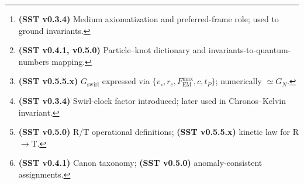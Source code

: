 \documentclass[reprint,aps,onecolumn,nofootinbib]{revtex4-2}
\newcommand{\swirlarrow}{%
    \mathchoice{\mkern-2mu\scriptstyle\boldsymbol{\circlearrowleft}}%
    {\mkern-2mu\scriptstyle\boldsymbol{\circlearrowleft}}%
    {\mkern-2mu\scriptscriptstyle\boldsymbol{\circlearrowleft}}%
    {\mkern-2mu\scriptscriptstyle\boldsymbol{\circlearrowleft}}%
}
\newcommand{\vswirl}{\mathbf{v}_{\swirlarrow}}
\newcommand{\FmaxEM}{F_{\mathrm{EM}}^{\max}}             %
\begin{document}
\begin{abstract}
\paragraph{Core Axioms (SST)}
    \begin{enumerate}
    \item \textbf{Swirl Medium:} Physics is formulated on $\mathbb{R}^3$ with absolute reference time. Dynamics occur in a frictionless, incompressible \emph{swirl condensate}, which serves as a universal substrate.\footnote{\textbf{(SST v0.3.4)} Medium axiomatization and preferred-frame role; used to ground invariants.}
    \item \textbf{Swirl Strings (Circulation and Topology):} Particles and field quanta correspond to closed vortex filaments (\emph{swirl strings}). The circulation of the swirl velocity around any closed loop is quantized:
    \[
        \Gamma = \oint \vswirl \cdot d\boldsymbol{\ell} = n\,\kappa,\qquad n\in\mathbb{Z},\qquad \kappa = \frac{h}{m_{\text{eff}}}.
    \]
    Discrete quantum numbers (mass, charge, spin) track to the topological invariants of the swirl string.\footnote{\textbf{(SST v0.4.1, v0.5.0)} Particle–knot dictionary and invariants-to-quantum-numbers mapping.}
    \item \textbf{String-induced gravitation:} Macroscopic attraction emerges from coherent swirl flows and swirl-pressure gradients. The effective gravitational coupling $G_{\text{swirl}}$ is fixed by canonical constants.\footnote{\textbf{(SST v0.5.5.x)} $G_{\text{swirl}}$ expressed via $\{v_{\circ},r_c,\FmaxEM,c,t_P\}$; numerically $\simeq G_N$.}
    \item \textbf{Swirl Clocks:} Local proper-time rate depends on tangential swirl speed $v$, ticking slower by the factor $S_t=\sqrt{\,1-v^2/c^2\,}$ relative to an observer at rest in the medium.\footnote{\textbf{(SST v0.3.4)} Swirl-clock factor introduced; later used in Chronos–Kelvin invariant.}
    \item \textbf{Dual Phases (Wave–Particle):} Each swirl string has two limiting phases: an extended \emph{R-phase} (unknotted, wave-like) and a localized \emph{T-phase} (knotted, particle-like). Measurement is a dynamical transition between these phases.\footnote{\textbf{(SST v0.5.0)} R/T operational definitions; \textbf{(SST v0.5.5.x)} kinetic law for R$\to$T.}
    \item \textbf{Taxonomy:} Unknotted excitations correspond to bosonic modes,
    with photons realized as \emph{pulsed torsional R-phase excitations} (rotational wave packets of the swirl director field).
    Torus knots correspond to leptons (e.g. electron = $3_1$), and chiral hyperbolic knots to quarks (proton = $5_2+5_2+6_1$ composite).\footnote{\textbf{(SST v0.4.1)} Canon taxonomy; \textbf{(SST v0.5.0)} anomaly-consistent assignments.} Linked knots describe nuclei and bound states. \\
    \end{enumerate}

    \vspace{1ex}\noindent
    \emph{Keywords:} vortex dynamics; topological fluid; quantum topology; emergent gauge theory; time dilation; wavefunction collapse
\end{abstract}
\end{document}
